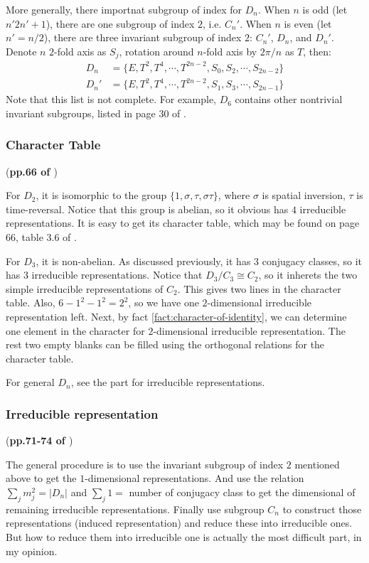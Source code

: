 More generally, there importnat subgroup of index for $D_n$. When $n$
is odd (let $n'2n'+1$), there are one subgroup of index $2$, i.e.
$C_n'$. When $n$ is even (let $n'=n/2$), there are three invariant
subgroup of index $2$: $C_n'$, $D_n$, and $D_n'$. Denote $n$ $2$-fold
axis as $S_j$, rotation around $n$-fold axis by $2\pi/n$ as $T$,
then:
\begin{align}
    D_n &= \{E, T^2,T^4,\cdots,T^{2n-2},S_0,S_2,\cdots,S_{2n-2}\} \\
    D_n' &= \{E, T^2,T^4,\cdots,T^{2n-2},S_1,S_3,\cdots,S_{2n-1}\}
\end{align}
Note that this list is not complete. For example, $D_6$ contains other
nontrivial invariant subgroups, listed in page 30 of \cite{book}.

\subsubsection{Character Table} (\textbf{pp.66 of \cite{book}})

For $D_2$, it is isomorphic to the group
$\{1,\sigma,\tau,\sigma\tau\}$, where $\sigma$ is spatial inversion,
$\tau$ is time-reversal. Notice that this group is abelian, so it
obvious has $4$ irreducible representations. It is easy to get its
character table, which may be found on page 66, table 3.6 of
\cite{book}.

For $D_3$, it is non-abelian. As discussed previously, it has $3$
conjugacy classes, so it has 3 irreducible representations. Notice
that $D_3/C_3 \cong C_2$, so it inherets the two simple irreducible
representations of $C_2$. This gives two lines in the character
table. Also, $6-1^2-1^2=2^2$, so we have one $2$-dimensional
irreducible representation left.  Next, by fact
\ref{fact:character-of-identity}, we can determine one element in the
character for $2$-dimensional irreducible representation. The rest two
empty blanks can be filled using the orthogonal relations for the
character table.

For general $D_n$, see the part for irreducible representations.

\subsubsection{Irreducible representation} 

(\textbf{pp.71-74 of \cite{book}}) 

The general procedure is to use the invariant subgroup of index $2$
mentioned above to get the $1$-dimensional representations. And use
the relation $\sum_j m_j^2 = |D_n|$ and $\sum_j 1 = $ number of
conjugacy class to get the dimensional of remaining irreducible
representations. Finally use subgroup $C_n$ to construct those
representations (induced representation) and reduce these into
irreducible ones. But how to reduce them into irreducible one is
actually the most difficult part, in my opinion.

